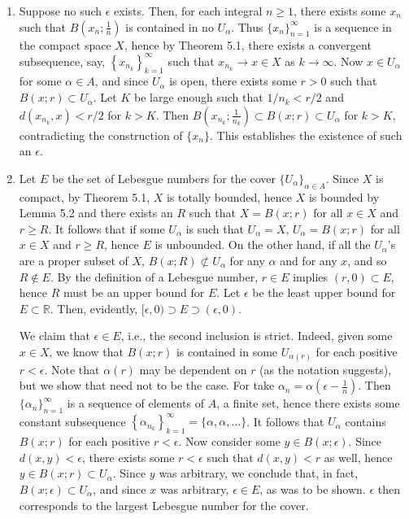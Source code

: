 \documentclass{article}
\begin{document}
\begin{enumerate}
\begin{itemize}
\begin{enumerate}
\item Suppose no such \(\epsilon\) exists.  Then, for each integral \(n \geq 1\), there exists some \(x_n\) such that \(B \left( x_n; \frac{1}{n} \right)\) is contained in no \(U_{\alpha}\).  Thus \(\{x_n\}_{n = 1}^{\infty}\) is a sequence in the compact space \(X\), hence by Theorem 5.1, there exists a convergent subsequence, say, \(\left\{ x_{n_k} \right\}_{k = 1}^{\infty}\) such that \(x_{n_k} \to x \in X\) as \(k \to \infty\).  Now \(x \in U_{\alpha}\) for some \(\alpha \in A\), and since \(U_{\alpha}\) is open, there exists some \(r > 0\) such that \(B(x;r) \subset U_{\alpha}\).  Let \(K\) be large enough such that \(1/n_k < r/2\) and \(d \left( x_{n_k}, x \right) < r/2\) for \(k > K\).  Then \(B \left( x_{n_k}; \frac{1}{n_k} \right) \subset B(x;r) \subset U_{\alpha}\) for \(k > K\), contradicting the construction of \(\{x_n\}\).  This establishes the existence of such an \(\epsilon\).

\item Let \(E\) be the set of Lebesgue numbers for the cover \(\{U_{\alpha}\}_{\alpha \in A}\).  Since \(X\) is compact, by Theorem 5.1, \(X\) is totally bounded, hence \(X\) is bounded by Lemma 5.2 and there exists an \(R\) such that \(X = B(x;r)\) for all \(x \in X\) and \(r \geq R\).  It follows that if some \(U_{\alpha}\) is such that \(U_{\alpha} = X\), \(U_{\alpha} = B(x;r)\) for all \(x \in X\) and \(r \geq R\), hence \(E\) is unbounded.  On the other hand, if all the \(U_{\alpha}\)'s are a proper subset of \(X\), \(B(x;R) \not\subset U_{\alpha}\) for any \(\alpha\) and for any \(x\), and so \(R \notin E\).  By the definition of a Lebesgue number, \(r \in E\) implies \((r,0) \subset E\), hence \(R\) must be an upper bound for \(E\).  Let \(\epsilon\) be the least upper bound for \(E \subset \mathbb{R}\).  Then, evidently, \([\epsilon,0) \supset E \supset (\epsilon,0)\).

We claim that \(\epsilon \in E\), i.e., the second inclusion is strict.  Indeed, given some \(x \in X\), we know that \(B(x;r)\) is contained in some \(U_{\alpha(r)}\) for each positive \(r < \epsilon\).  Note that \(\alpha(r)\) may be dependent on \(r\) (as the notation suggests), but we show that need not to be the case.  For take \(\alpha_n = \alpha \left( \epsilon - \frac{1}{n} \right)\).  Then \(\{\alpha_n\}_{n = 1}^{\infty}\) is a sequence of elements of \(A\), a finite set, hence there exists some constant subsequence \(\left\{ \alpha_{n_k} \right\}_{k = 1}^{\infty} = \{\alpha, \alpha, \ldots\}\).  It follows that \(U_{\alpha}\) contains \(B(x;r)\) for each positive \(r < \epsilon\).  Now consider some \(y \in B(x;\epsilon)\).  Since \(d(x,y) < \epsilon\), there exists some \(r < \epsilon\) such that \(d(x,y) < r\) as well, hence \(y \in B(x;r) \subset U_{\alpha}\).  Since \(y\) was arbitrary, we conclude that, in fact, \(B(x;\epsilon) \subset U_{\alpha}\), and since \(x\) was arbitrary, \(\epsilon \in E\), as was to be shown.  \(\epsilon\) then corresponds to the largest Lebesgue number for the cover.
\end{enumerate}




\end{itemize}
\end{enumerate}
\end{document}
